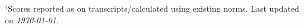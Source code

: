 \documentclass[10pt,a4paper]{article}
\newcommand{\secHeader}[1]{\vspace{0.25em} \noindent{\large \textsc{#1}\vspace{-0.55em}

\noindent
\begin{tikzpicture}
\draw[color=black, line width=0.2mm] (0,1) -- (0.99\textwidth,1);
\end{tikzpicture}}\vspace{0.3em}
}
\begin{document}

% 



\vfill

\noindent
$^{\dagger}$Scores reported as on transcripts/calculated using existing norms. \hfill Last updated on \textit{\today}.
\end{document}
